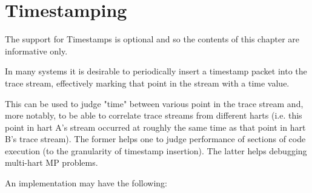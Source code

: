 \chapter{Timestamping} \label{ch:timestamping}

The support for Timestamps is optional and so the contents of this chapter are informative only.


In many systems it is desirable to periodically insert a
timestamp packet into the trace stream, effectively marking that point
in the stream with a time value.

This can be used to judge "time" between various point in the trace
stream and, more notably, to be able to correlate trace streams from
different harts (i.e. this point in hart A's stream occurred at
roughly the same time as that point in hart B's trace stream).  The
former helps one to judge performance of sections of code execution
(to the granularity of timestamp insertion). The latter helps
debugging multi-hart MP problems.

An implementation may have the following: 

